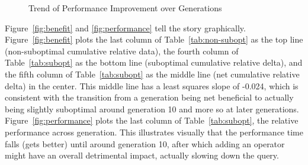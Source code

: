 \documentclass[prodmode,acmtods]{acmsmall}
\begin{document}
\begin{figure}
    \hspace{-0.17in}
    \caption{Trend of Performance Improvement over Generations}
    \label{fig:machine_comp}
\end{figure}

Figure~\ref{fig:benefit} and \ref{fig:performance} tell the story
graphically. Figure~\ref{fig:benefit} plots the last column of
Table~\ref{tab:non-subopt} as the top line (non-suboptimal cumulative
relative data), the fourth column of Table~\ref{tab:subopt} as the bottom
line (suboptimal cumulative relative delta), and the fifth column of
Table~\ref{tab:subopt} as the middle line (net cumulative relative delta)
in the center. This middle line has a least squares slope of -0.024, which
is consistent with the transition from a generation being net beneficial to
actually being slightly suboptimal around generation 10 and more so at later
generations. Figure~\ref{fig:performance} plots the last column of
Table~\ref{tab:subopt}, the relative performance across generation. This
illustrates visually that the performance time falls (gets better) until
around generation 10, after which adding an operator might have an overall
detrimental impact, actually slowing down the query.
\end{document}
